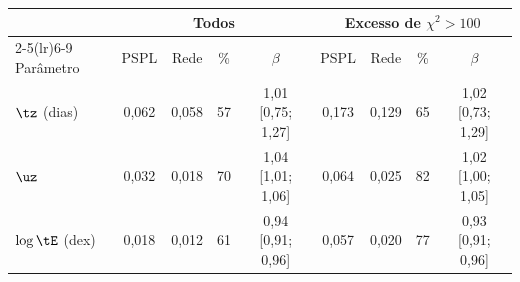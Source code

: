 \begin{tabular}{lcccccccc}
	\toprule
	 & \multicolumn{4}{c}{Todos} & \multicolumn{4}{c}{Excesso de $\chi^2 > 100$} \\
	\cmidrule(lr){2-5}\cmidrule(lr){6-9}
	Parâmetro & PSPL & Rede & \% & $\beta$ & PSPL & Rede & \% & $\beta$ \\
	\midrule
	$\tz$ (dias) & 0{,}062 & 0{,}058 & 57 & 1{,}01 [0{,}75; 1{,}27] & 0{,}173 & 0{,}129 & 65 & 1{,}02 [0{,}73; 1{,}29] \\
	$\uz$ & 0{,}032 & 0{,}018 & 70 & 1{,}04 [1{,}01; 1{,}06] & 0{,}064 & 0{,}025 & 82 & 1{,}02 [1{,}00; 1{,}05] \\
	$\log \tE$ (dex) & 0{,}018 & 0{,}012 & 61 & 0{,}94 [0{,}91; 0{,}96] & 0{,}057 & 0{,}020 & 77 & 0{,}93 [0{,}91; 0{,}96] \\
	\bottomrule
\end{tabular}
